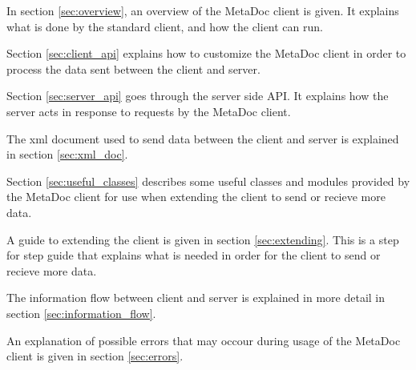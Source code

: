 In section \ref{sec:overview}, an overview of the MetaDoc client is given. It
explains what is done by the standard client, and how the client can run. 

Section \ref{sec:client_api} explains how to customize the MetaDoc client in
order to process the data sent between the client and server. 

Section \ref{sec:server_api} goes through the server side API. It explains how
the server acts in response to requests by the MetaDoc client. 

The \gls{xml} document used to send data between the client and server is
explained in section \ref{sec:xml_doc}. 

Section \ref{sec:useful_classes} describes some useful classes and modules
provided by the MetaDoc client for use when extending the client to send or
recieve more data. 

A guide to extending the client is given in section \ref{sec:extending}. This
is a step for step guide that explains what is needed in order for the client
to send or recieve more data. 

The information flow between client and server is explained in more detail in
section \ref{sec:information_flow}.

An explanation of possible errors that may occour during usage of the MetaDoc
client is given in section \ref{sec:errors}. 

